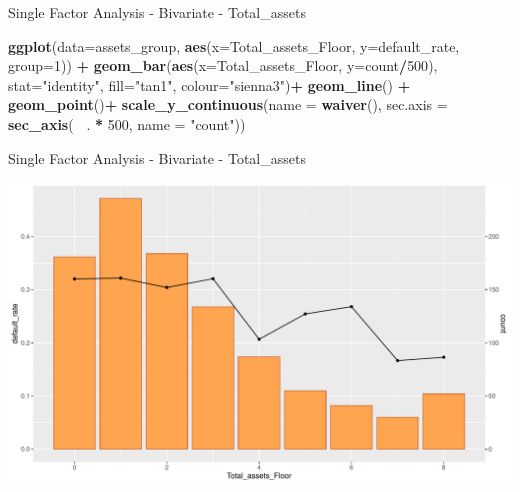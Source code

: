 \documentclass[9pt,ignorenonframetext,]{beamer}
\newenvironment{Shaded}{\begin{snugshade}}{\end{snugshade}}
\newcommand{\KeywordTok}[1]{\textcolor[rgb]{0.13,0.29,0.53}{\textbf{#1}}}
\newcommand{\DataTypeTok}[1]{\textcolor[rgb]{0.13,0.29,0.53}{#1}}
\newcommand{\DecValTok}[1]{\textcolor[rgb]{0.00,0.00,0.81}{#1}}
\newcommand{\StringTok}[1]{\textcolor[rgb]{0.31,0.60,0.02}{#1}}
\newcommand{\OperatorTok}[1]{\textcolor[rgb]{0.81,0.36,0.00}{\textbf{#1}}}
\newcommand{\NormalTok}[1]{#1}
\begin{document}
\begin{frame}[fragile]{Single Factor Analysis - Bivariate -
Total\_assets}

\begin{Shaded}
\begin{Highlighting}[]
\KeywordTok{ggplot}\NormalTok{(}\DataTypeTok{data=}\NormalTok{assets_group, }\KeywordTok{aes}\NormalTok{(}\DataTypeTok{x=}\NormalTok{Total_assets_Floor, }\DataTypeTok{y=}\NormalTok{default_rate,}
                              \DataTypeTok{group=}\DecValTok{1}\NormalTok{)) }\OperatorTok{+}
\StringTok{    }\KeywordTok{geom_bar}\NormalTok{(}\KeywordTok{aes}\NormalTok{(}\DataTypeTok{x=}\NormalTok{Total_assets_Floor, }\DataTypeTok{y=}\NormalTok{count}\OperatorTok{/}\DecValTok{500}\NormalTok{),}
             \DataTypeTok{stat=}\StringTok{"identity"}\NormalTok{,}
             \DataTypeTok{fill=}\StringTok{"tan1"}\NormalTok{, }\DataTypeTok{colour=}\StringTok{"sienna3"}\NormalTok{)}\OperatorTok{+}
\StringTok{    }\KeywordTok{geom_line}\NormalTok{() }\OperatorTok{+}
\StringTok{    }\KeywordTok{geom_point}\NormalTok{()}\OperatorTok{+}
\StringTok{    }\KeywordTok{scale_y_continuous}\NormalTok{(}\DataTypeTok{name =} \KeywordTok{waiver}\NormalTok{(),}
                       \DataTypeTok{sec.axis =} \KeywordTok{sec_axis}\NormalTok{(}\OperatorTok{~}\StringTok{ }\NormalTok{. }\OperatorTok{*}\StringTok{ }\DecValTok{500}\NormalTok{,}
                                           \DataTypeTok{name =} \StringTok{"count"}\NormalTok{))}
\end{Highlighting}
\end{Shaded}

\end{frame}

\begin{frame}{Single Factor Analysis - Bivariate - Total\_assets}

\includegraphics{Risk-Models-Development-Process_files/figure-beamer/unnamed-chunk-32-1.pdf}

\end{frame}
\end{document}
